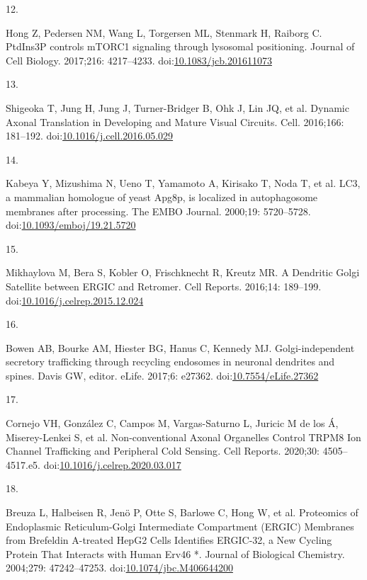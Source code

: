\documentclass[
  12pt,
  a4paper,
]{book}
\newlength{\cslhangindent}
\newlength{\csllabelwidth}
\newlength{\cslentryspacingunit} %
\newenvironment{CSLReferences}[2] %
 {%
  \setlength{\parindent}{0pt}
  \ifodd #1
  \let\oldpar\par
  \def\par{\hangindent=\cslhangindent\oldpar}
  \fi
  \setlength{\parskip}{#2\cslentryspacingunit}
 }%
 {}
\newcommand{\CSLLeftMargin}[1]{\parbox[t]{\csllabelwidth}{#1}}
\newcommand{\CSLRightInline}[1]{\parbox[t]{\linewidth - \csllabelwidth}{#1}\break}
\begin{document}
\begin{CSLReferences}{0}{0}
\leavevmode{}%
\CSLLeftMargin{12. }%
\CSLRightInline{Hong Z, Pedersen NM, Wang L, Torgersen ML, Stenmark H, Raiborg C. {PtdIns3P} controls {mTORC1} signaling through lysosomal positioning. Journal of Cell Biology. 2017;216: 4217--4233. doi:\href{https://doi.org/10.1083/jcb.201611073}{10.1083/jcb.201611073}}

\leavevmode{}%
\CSLLeftMargin{13. }%
\CSLRightInline{Shigeoka T, Jung H, Jung J, Turner-Bridger B, Ohk J, Lin JQ, et al. Dynamic {Axonal Translation} in {Developing} and {Mature Visual Circuits}. Cell. 2016;166: 181--192. doi:\href{https://doi.org/10.1016/j.cell.2016.05.029}{10.1016/j.cell.2016.05.029}}

\leavevmode{}%
\CSLLeftMargin{14. }%
\CSLRightInline{Kabeya Y, Mizushima N, Ueno T, Yamamoto A, Kirisako T, Noda T, et al. {LC3}, a mammalian homologue of yeast {Apg8p}, is localized in autophagosome membranes after processing. The EMBO Journal. 2000;19: 5720--5728. doi:\href{https://doi.org/10.1093/emboj/19.21.5720}{10.1093/emboj/19.21.5720}}

\leavevmode{}%
\CSLLeftMargin{15. }%
\CSLRightInline{Mikhaylova M, Bera S, Kobler O, Frischknecht R, Kreutz MR. A {Dendritic Golgi Satellite} between {ERGIC} and {Retromer}. Cell Reports. 2016;14: 189--199. doi:\href{https://doi.org/10.1016/j.celrep.2015.12.024}{10.1016/j.celrep.2015.12.024}}

\leavevmode{}%
\CSLLeftMargin{16. }%
\CSLRightInline{Bowen AB, Bourke AM, Hiester BG, Hanus C, Kennedy MJ. Golgi-independent secretory trafficking through recycling endosomes in neuronal dendrites and spines. Davis GW, editor. eLife. 2017;6: e27362. doi:\href{https://doi.org/10.7554/eLife.27362}{10.7554/eLife.27362}}

\leavevmode{}%
\CSLLeftMargin{17. }%
\CSLRightInline{Cornejo VH, González C, Campos M, Vargas-Saturno L, Juricic M de los Á, Miserey-Lenkei S, et al. Non-conventional {Axonal Organelles Control TRPM8 Ion Channel Trafficking} and {Peripheral Cold Sensing}. Cell Reports. 2020;30: 4505--4517.e5. doi:\href{https://doi.org/10.1016/j.celrep.2020.03.017}{10.1016/j.celrep.2020.03.017}}

\leavevmode{}%
\CSLLeftMargin{18. }%
\CSLRightInline{Breuza L, Halbeisen R, Jenö P, Otte S, Barlowe C, Hong W, et al. Proteomics of {Endoplasmic Reticulum-Golgi Intermediate Compartment} ({ERGIC}) {Membranes} from {Brefeldin A-treated HepG2 Cells Identifies ERGIC-32}, a {New Cycling Protein That Interacts} with {Human Erv46} *. Journal of Biological Chemistry. 2004;279: 47242--47253. doi:\href{https://doi.org/10.1074/jbc.M406644200}{10.1074/jbc.M406644200}}


\end{CSLReferences}
\end{document}
